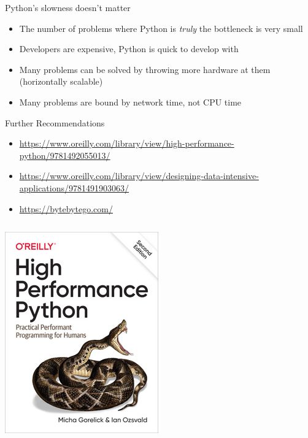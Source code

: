 \documentclass[12pt, aspectration=169]{beamer}
\begin{document}
    \begin{frame}{Python's slowness doesn't matter}
        \begin{itemize}
            \item The number of problems where Python is \textit{truly} the bottleneck is very small
            \item Developers are expensive, Python is quick to develop with
            \item Many problems can be solved by throwing more hardware at them (horizontally scalable)
            \item Many problems are bound by network time, not CPU time
        \end{itemize}
    \end{frame}

    \begin{frame}{Further Recommendations}
        \begin{itemize}
            \item \url{https://www.oreilly.com/library/view/high-performance-python/9781492055013/}
            \item \url{https://www.oreilly.com/library/view/designing-data-intensive-applications/9781491903063/}
            \item \url{https://bytebytego.com/}
        \end{itemize}
        \begin{center}
            \begin{columns}
                \includegraphics[scale=0.35]{static/images/HighPerformancePython2ndEdition}

\end{columns}
\end{center}
\end{frame}
\end{document}
